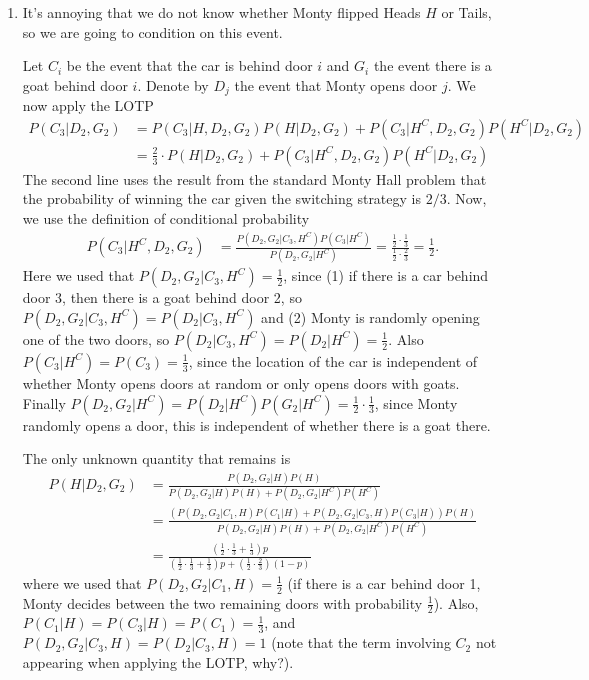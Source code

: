 

\setcounter{theorem}{40}
\begin{exercise}[BH.2.41]
\begin{solution}
	\begin{enumerate}
		\item It's annoying that we do not know whether Monty flipped Heads $H$ or Tails, so we are going to condition on this event.  
	
		Let $C_{i}$ be the event that the car is behind door $i$ and $G_{i}$ the event there is a goat behind door $i$. Denote by $D_j$ the event that Monty opens door $j$. We now apply the LOTP
		\begin{align*}
			P(C_{3}|D_{2},G_{2})& = P(C_{3}|H,D_{2},G_{2})P(H|D_{2},G_{2}) + P(C_{3}|H^{C},D_{2},G_{2})P(H^{C}|D_{2},G_{2})\\
			& = \frac{2}{3}\cdot P(H|D_{2},G_{2}) + P(C_{3}|H^{C},D_{2},G_{2})P(H^{C}|D_{2},G_{2})
		\end{align*}
		The second line uses the result from the standard Monty Hall problem that the probability of winning the car given the switching strategy is $2/3$. Now, we use the definition of conditional probability
		\begin{align*}
			P(C_{3}|H^{C},D_{2},G_{2}) &=\frac{P(D_{2},G_{2}|C_{3},H^{C})P(C_{3}|H^{C})}{P(D_{2},G_{2}|H^{C})}=\frac{\frac{1}{2}\cdot \frac{1}{3}}{\frac{1}{2}\cdot \frac{2}{3}}=\frac{1}{2}.
		\end{align*}
		Here we used that $P(D_{2},G_{2}|C_{3},H^{C})=\frac{1}{2}$, since (1) if there is a car behind door 3, then there is a goat behind door 2, so $P(D_{2},G_{2}|C_{3},H^{C})=P(D_{2}|C_{3},H^{C})$ and (2) Monty is randomly opening one of the two doors, so $P(D_{2}|C_{3},H^{C})=P(D_{2}|H^{C})=\frac{1}{2}$. Also $P(C_{3}|H^{C})=P(C_{3})=\frac{1}{3}$, since the location of the car is independent of whether Monty opens doors at random or only opens doors with goats. Finally $P(D_{2},G_{2}|H^{C})=P(D_{2}|H^{C})P(G_{2}|H^{C})=\frac{1}{2}\cdot \frac{1}{3}$, since Monty randomly opens a door, this is independent of whether there is a goat there.

		The only unknown quantity that remains is
		\begin{align*}
			P(H|D_{2},G_{2})& = \frac{P(D_{2},G_{2}|H)P(H)}{P(D_{2},G_{2}|H)P(H)+P(D_{2},G_{2}|H^C)P(H^C)} \\
			&= \frac{(P(D_{2},G_{2}|C_{1},H)P(C_{1}|H)+P(D_{2},G_{2}|C_{3},H)P(C_{3}|H))P(H)}{P(D_{2},G_{2}|H)P(H)+P(D_{2},G_{2}|H^C)P(H^C)}\tag*{(LOTP)} \\
			&= \frac{(\frac{1}{2}\cdot \frac{1}{3}+\frac{1}{3})p}{(\frac{1}{2}\cdot \frac{1}{3}+\frac{1}{3})p+(\frac{1}{2}\cdot \frac{2}{3})(1-p)}
		\end{align*}
		where we used that $P(D_{2},G_{2}|C_{1},H)=\frac{1}{2}$ (if there is a car behind door 1, Monty decides between the two remaining doors with probability $\frac{1}{2}$). Also, $P(C_{1}|H)=P(C_{3}|H)=P(C_{1})=\frac{1}{3}$, and $P(D_{2},G_{2}|C_{3},H)=P(D_{2}|C_{3},H)=1$ (note that the term involving $C_{2}$ not appearing when applying the LOTP, why?). 


\end{enumerate}
\end{solution}
\end{exercise}
